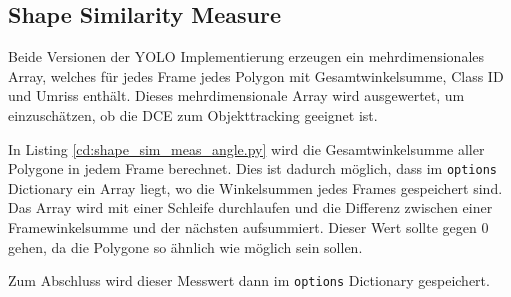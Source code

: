 \subsection{Shape Similarity Measure}{
	\label{py:Shape_Sim_Meas}
	Beide Versionen der YOLO Implementierung erzeugen ein mehrdimensionales Array, welches für jedes Frame jedes Polygon mit Gesamtwinkelsumme, Class ID und Umriss enthält. Dieses mehrdimensionale Array wird ausgewertet, um einzuschätzen, ob die DCE zum Objekttracking geeignet ist. 

	In Listing \ref{cd:shape_sim_meas_angle.py} wird die Gesamtwinkelsumme aller Polygone in jedem Frame berechnet. Dies ist dadurch möglich, dass im \lstinline|options| Dictionary ein Array liegt, wo die Winkelsummen jedes Frames gespeichert sind. Das Array wird mit einer Schleife durchlaufen und die Differenz zwischen einer Framewinkelsumme und der nächsten aufsummiert. Dieser Wert sollte gegen 0 gehen, da die Polygone so ähnlich wie möglich sein sollen.
	
	Zum Abschluss wird dieser Messwert dann im \lstinline|options| Dictionary gespeichert.

}
